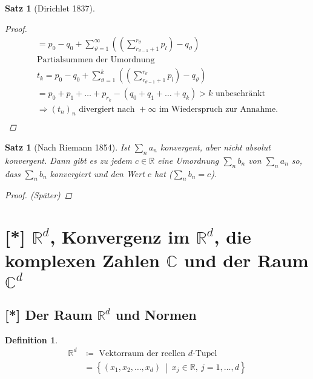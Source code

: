 \documentclass[11pt, twoside, a4paper]{article}
\theoremstyle{plain}
\newtheorem{definition}[blockelement]{Definition}
\newtheorem{satz}[blockelement]{Satz}
\newcommand{\set}[1]{\left\{#1\right\}}
\newcommand{\pair}[1]{\left(#1\right)}
\newcommand{\impl}[0]{\Rightarrow{}}
\newcommand{\definedas}[0]{\coloneqq}
\newcommand{\R}{\mathbb{R}}
\newcommand{\C}{\mathbb{C}}
\begin{document}
\begin{satz}[Dirichlet 1837]
\begin{proof}
            \begin{align*}
                = p_0 - q_0 + \sum_{\vartheta = 1}^{\infty}\pair{ \pair{\sum_{r_{\vartheta - 1} + 1}^{r_{\vartheta}} p_l} - q_{\vartheta}}\\
                \text{Partialsummen der Umordnung}\\
                t_{k} = p_0 - q_0 + \sum_{\vartheta = 1}^{k}\pair{ \pair{\sum_{r_{\vartheta - 1} + 1}^{r_{\vartheta}} p_l} - q_{\vartheta}}\\
                = p_0 + p_1 + \dots + p_{r_k} - \pair{q_0 + q_1 + \dots + q_k} > k \text{ unbeschränkt}\\
                \impl \pair{t_n}_n \text{ divergiert nach } + \infty \text { im Wiederspruch zur Annahme.}\\
            \end{align*}
        \end{proof}
    \end{satz}


    \begin{satz}[Nach Riemann 1854]
        \marginnote{[14. Dez]}
        Ist $\sum_n a_n$ konvergent, aber nicht absolut konvergent. Dann gibt es zu jedem $c\in\R$ eine Umordnung $\sum_{n}^{} b_n$ von $\sum_{n}^{} a_n$ so, dass $\sum_n b_n$ konvergiert und den Wert $c$ hat ($\sum_{n} b_n = c$).

        \begin{proof}
        (Später)
        \end{proof}
    \end{satz}

    \newpage


    \section{[*] $\R^d$, Konvergenz im $\R^d$, die komplexen Zahlen $\C$ und der Raum $\C^d$}

    \subsection{[*] Der Raum $\R^d$ und Normen}

    \thispagestyle{pagenumberonly}

    \begin{definition}
        \begin{align*}
            \R^d &\definedas\text{ Vektorraum der reellen $d$-Tupel}\\
            &=\set{\pair{x_1, x_2, \dots, x_d} ~\middle|~ x_j\in\R,~ j=1,\dots,d }\\
        \end{align*}
    \end{definition}
\end{document}
